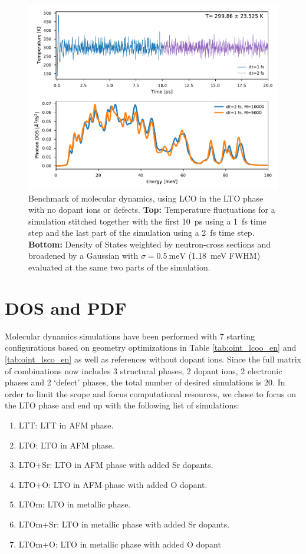 \begin{figure}
	\centering
	\includegraphics[width=\textwidth]{fig/md/stitch.pdf}
	\caption[stitched md runs]{Benchmark of molecular dynamics, using LCO in the LTO phase with no dopant ions or defects. \textbf{Top:} Temperature fluctuations for a simulation stitched together with the first \SI{10}{\pico\second} using a \SI{1}{\femto\second} time step and the last part of the simulation using a \SI{2}{\femto\second} time step. \textbf{Bottom:} Density of States weighted by neutron-cross sections and broadened by a Gaussian with $\sigma=\SI{0.5}{\milli\eV}$ (\SI{1.18}{\milli\eV} FWHM) evaluated at the same two parts of the simulation.}
	\label{fig:stitch}
\end{figure}

\section{DOS and PDF}
Molecular dynamics simulations have been performed with 7 starting configurations based on geometry optimizations in Table \ref{tab:oint_lcoo_en} and \ref{tab:oint_lsco_en} as well as references without dopant ions. Since the full matrix of combinations now includes 3 structural phases, 2 dopant ions, 2 electronic phases and 2 `defect' phases, the total number of desired simulations is 20. In order to limit the scope and focus computational resources, we chose to focus on the LTO phase and end up with the following list of simulations:

\begin{enumerate}
	\item LTT: LTT in AFM phase.
	\item LTO: LTO in AFM phase.
	\item LTO+Sr: LTO in AFM phase with added Sr dopants.
	\item LTO+O: LTO in AFM phase with added O dopant.
	\item LTOm: LTO in metallic phase.
	\item LTOm+Sr: LTO in metallic phase with added Sr dopants.
	\item LTOm+O: LTO in metallic phase with added O dopant
\end{enumerate}

